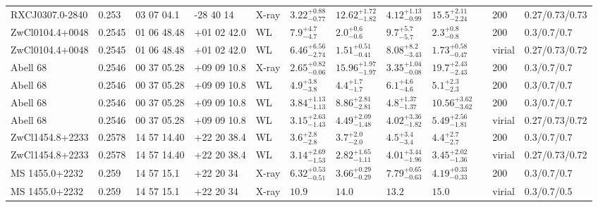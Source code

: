 \begin{landscape}
\begin{center}
{\begin{longtable}{llllllllllll}
RXCJ0307.0-2840 & 0.253 & 03 07 04.1 & -28 40 14 & X-ray & ${3.22}^{+0.88}_{-0.77}$ & ${12.62}^{+1.72}_{-1.82}$ & ${4.12}^{+1.13}_{-0.99}$ & ${15.5}^{+2.11}_{-2.24}$ & \citet{BA14.1} & 200 & 0.27/0.73/0.73 \\
ZwCl0104.4+0048 & 0.2545 & 01 06 48.48 & +01 02 42.0 & WL & ${7.9}^{+4.7}_{-4.7}$ & ${2.0}^{+0.6}_{-0.6}$ & ${9.7}^{+5.7}_{-5.7}$ & ${2.3}^{+0.8}_{-0.8}$ & \citet{SE14.1} & 200 & 0.3/0.7/0.7 \\
ZwCl0104.4+0048 & 0.2545 & 01 06 48.48 & +01 02 42.0 & WL & ${6.46}^{+6.56}_{-2.74}$ & ${1.51}^{+0.51}_{-0.41}$ & ${8.08}^{+8.2}_{-3.43}$ & ${1.73}^{+0.58}_{-0.47}$ & \citet{OK10.1} & virial & 0.27/0.73/0.72 \\
Abell 68 & 0.2546 & 00 37 05.28 & +09 09 10.8 & X-ray & ${2.65}^{+0.82}_{-0.06}$ & ${15.96}^{+1.97}_{-1.97}$ & ${3.35}^{+1.04}_{-0.08}$ & ${19.7}^{+2.43}_{-2.43}$ & \citet{ET11.1} & 200 & 0.3/0.7/0.7 \\
Abell 68 & 0.2546 & 00 37 05.28 & +09 09 10.8 & WL & ${4.9}^{+3.8}_{-3.8}$ & ${4.4}^{+1.7}_{-1.7}$ & ${6.1}^{+4.6}_{-4.6}$ & ${5.1}^{+2.3}_{-2.3}$ & \citet{SE14.1} & 200 & 0.3/0.7/0.7 \\
Abell 68 & 0.2546 & 00 37 05.28 & +09 09 10.8 & WL & ${3.84}^{+1.13}_{-1.13}$ & ${8.86}^{+2.81}_{-2.81}$ & ${4.8}^{+1.37}_{-1.37}$ & ${10.56}^{+3.62}_{-3.62}$ & \citet{BA07.1} & 200 & 0.3/0.7/0.7 \\
Abell 68 & 0.2546 & 00 37 05.28 & +09 09 10.8 & WL & ${3.15}^{+2.63}_{-1.43}$ & ${4.49}^{+2.09}_{-1.48}$ & ${4.02}^{+3.36}_{-1.82}$ & ${5.49}^{+2.56}_{-1.81}$ & \citet{OK10.1} & virial & 0.27/0.73/0.72 \\
ZwCl1454.8+2233 & 0.2578 & 14 57 14.40 & +22 20 38.4 & WL & ${3.6}^{+2.8}_{-2.8}$ & ${3.7}^{+2.0}_{-2.0}$ & ${4.5}^{+3.4}_{-3.4}$ & ${4.4}^{+2.7}_{-2.7}$ & \citet{SE14.1} & 200 & 0.3/0.7/0.7 \\
ZwCl1454.8+2233 & 0.2578 & 14 57 14.40 & +22 20 38.4 & WL & ${3.14}^{+2.69}_{-1.53}$ & ${2.82}^{+1.65}_{-1.11}$ & ${4.01}^{+3.44}_{-1.96}$ & ${3.45}^{+2.02}_{-1.36}$ & \citet{OK10.1} & virial & 0.27/0.73/0.72 \\
MS 1455.0+2232 & 0.259 & 14 57 15.1 & +22 20 34 & X-ray & ${6.32}^{+0.53}_{-0.51}$ & ${3.66}^{+0.29}_{-0.29}$ & ${7.79}^{+0.65}_{-0.63}$ & ${4.19}^{+0.33}_{-0.33}$ & \citet{ET11.1} & 200 & 0.3/0.7/0.7 \\
MS 1455.0+2232 & 0.259 & 14 57 15.1 & +22 20 34 & X-ray & ${10.9}^{}_{}$ & ${14.0}^{}_{}$ & ${13.2}^{}_{}$ & ${15.0}^{}_{}$ & \citet{MO99.1} & virial & 0.3/0.7/0.5 \\

\end{longtable}}
\end{center}
\end{landscape}
